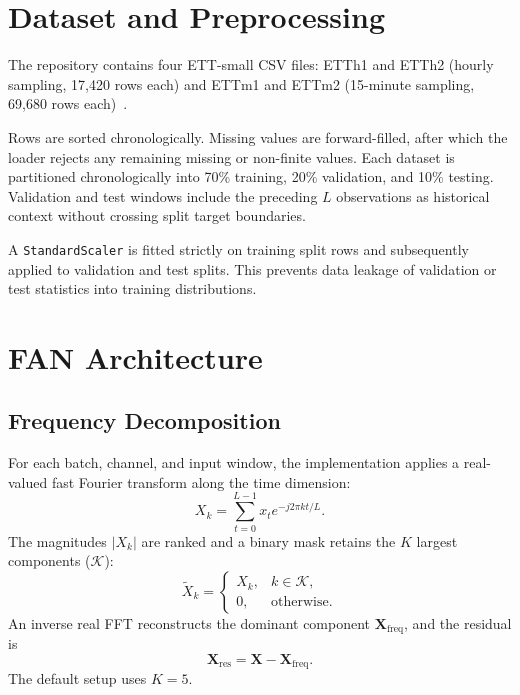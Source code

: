 \documentclass[conference,10pt]{IEEEtran}
\begin{document}
\section{Dataset and Preprocessing}
The repository contains four ETT-small CSV files: ETTh1 and ETTh2 (hourly sampling, 17,420 rows each) and ETTm1 and ETTm2 (15-minute sampling, 69,680 rows each)~\cite{ettdataset}.

Rows are sorted chronologically. Missing values are forward-filled, after which the loader rejects any remaining missing or non-finite values. Each dataset is partitioned chronologically into 70\% training, 20\% validation, and 10\% testing. Validation and test windows include the preceding $L$ observations as historical context without crossing split target boundaries.

A \texttt{StandardScaler} is fitted strictly on training split rows and subsequently applied to validation and test splits. This prevents data leakage of validation or test statistics into training distributions.

\section{FAN Architecture}
\subsection{Frequency Decomposition}
For each batch, channel, and input window, the implementation applies a real-valued fast Fourier transform along the time dimension:
\begin{equation}
X_k=\sum_{t=0}^{L-1}x_t e^{-j2\pi kt/L}.
\end{equation}
The magnitudes $|X_k|$ are ranked and a binary mask retains the $K$ largest components ($\mathcal{K}$):
\begin{equation}
\widetilde{X}_k=
\begin{cases}
X_k, & k\in\mathcal{K},\\
0, & \text{otherwise}.
\end{cases}
\end{equation}
An inverse real FFT reconstructs the dominant component $\mathbf{X}_{\mathrm{freq}}$, and the residual is
\begin{equation}
\mathbf{X}_{\mathrm{res}}=\mathbf{X}-\mathbf{X}_{\mathrm{freq}}.
\label{eq:residual}
\end{equation}
The default setup uses $K=5$.
\end{document}
